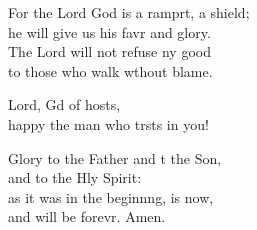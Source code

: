 \begin{psalmverse}
\begin{patverse}
For the Lord God is a ramprt, a shield;\Med\\
he will give us his favr and glory.\\
The Lord will not refuse ny good\Med\\
to those who walk w\pointup{\i}thout blame.

Lord, Gd of hosts,\Med\\
happy the man who trsts in you!

Glory to the Father and t the Son,\Med\\
and to the Hly Spirit:\\
as it was in the beginn\pointup{\i}ng, is now,\Med\\
and will be forevr. Amen. 
  \end{patverse}
\end{psalmverse}
